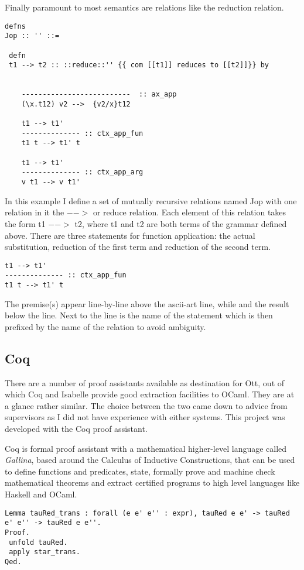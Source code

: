 \documentclass[12pt,twoside,notitlepage]{report}
\begin{document}
Finally paramount to most semantics are relations like the reduction relation.
\begin{lstlisting}[language={Ott}, caption={Ott reduction relation example}]
defns
Jop :: '' ::=

 defn
 t1 --> t2 :: ::reduce::'' {{ com [[t1]] reduces to [[t2]]}} by


    --------------------------  :: ax_app
    (\x.t12) v2 -->  {v2/x}t12

    t1 --> t1'
    -------------- :: ctx_app_fun
    t1 t --> t1' t

    t1 --> t1'
    -------------- :: ctx_app_arg
    v t1 --> v t1'
\end{lstlisting}
In this example I define a set of mutually recursive relations named Jop with one relation in it the $-->$ or reduce relation. Each element of this relation takes the form t1 $-->$ t2, where t1 and t2 are both terms of the grammar defined above. There are three statements for function application: the actual substitution, reduction of the first term and reduction of the second term. 
\begin{lstlisting}[language={Ott}, caption={Ott single reduction}]
t1 --> t1'
-------------- :: ctx_app_fun
t1 t --> t1' t
\end{lstlisting}
The premise(s) appear line-by-line above the ascii-art line, while and the result below the line. Next to the line is the name of the statement which is then prefixed by the name of the relation to avoid ambiguity. 



\subsection{Coq}
There are a number of proof assistants available as destination for Ott, out of which Coq and Isabelle provide good extraction facilities to OCaml. They are at a glance rather similar. The choice between the two came down to advice from supervisors as I did not have experience with either systems. This project was developed with the Coq proof assistant. 

Coq is formal proof assistant with a mathematical higher-level language called \textit{Gallina}, based around the Calculus of Inductive Constructions, that can be used to define functions and predicates, state, formally prove and machine check mathematical theorems and extract certified programs to high level languages like Haskell and OCaml.
\begin{lstlisting}[language={Coq},caption={Coq example}]
Lemma tauRed_trans : forall (e e' e'' : expr), tauRed e e' -> tauRed e' e'' -> tauRed e e''.
Proof.
 unfold tauRed.
 apply star_trans.
Qed.
\end{lstlisting}
\end{document}

